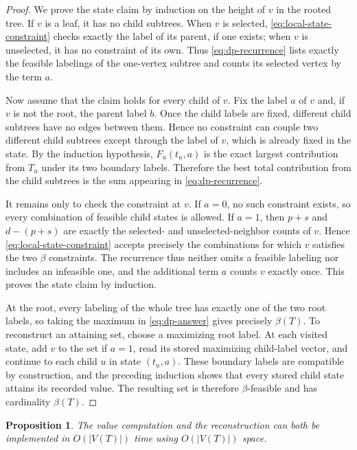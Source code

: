 \documentclass[preprint,12pt]{elsarticle}
\newtheorem{proposition}[theorem]{Proposition}
\numberwithin{equation}{section}
\begin{document}
\begin{proof}
We prove the state claim by induction on the height of
\(v\) in the rooted tree. If \(v\) is a leaf, it has no child subtrees.
When \(v\) is selected, \eqref{eq:local-state-constraint} checks exactly the label of its parent, if
one exists; when \(v\) is unselected, it has no constraint of its own.
Thus \eqref{eq:dp-recurrence} lists exactly the feasible labelings of the one-vertex
subtree and counts its selected vertex by the term \(a\).

Now assume that the claim holds for every child of \(v\). Fix the label
\(a\) of \(v\) and, if \(v\) is not the root, the parent label \(b\).
Once the child labels are fixed, different child subtrees have no edges
between them. Hence no constraint can couple two different child
subtrees except through the label of \(v\), which is already fixed in
the state. By the induction hypothesis, \(F_u(t_u,a)\) is the exact
largest contribution from \(T_u\) under its two boundary labels.
Therefore the best total contribution from the child subtrees is the sum
appearing in \eqref{eq:dp-recurrence}.

It remains only to check the constraint at \(v\). If \(a=0\), no such
constraint exists, so every combination of feasible child states is
allowed. If \(a=1\), then \(p+s\) and \(d-(p+s)\) are exactly the
selected- and unselected-neighbor counts of \(v\). Hence \eqref{eq:local-state-constraint} accepts
precisely the combinations for which \(v\) satisfies the two \(\beta\)
constraints. The recurrence thus neither omits a feasible labeling nor
includes an infeasible one, and the additional term \(a\) counts \(v\)
exactly once. This proves the state claim by induction.

At the root, every labeling of the whole tree has exactly one of the two
root labels, so taking the maximum in \eqref{eq:dp-answer} gives precisely
\(\beta(T)\). To reconstruct an attaining set, choose a maximizing root
label. At each visited state, add \(v\) to the set if \(a=1\), read its
stored maximizing child-label vector, and continue to each child \(u\)
in state \((t_u,a)\). These boundary labels are compatible by
construction, and the preceding induction shows that every stored child
state attains its recorded value. The resulting set is therefore
\(\beta\)-feasible and has cardinality \(\beta(T)\).
\end{proof}

\begin{proposition}\label{prop:dp-complexity}
The value computation and the reconstruction
can both be implemented in \(O(|V(T)|)\) time using \(O(|V(T)|)\) space.
\end{proposition}
\end{document}
